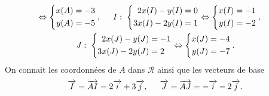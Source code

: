 \begin{enumerate}
\begin{multline*}
  \Leftrightarrow
  \left\lbrace
  \begin{aligned}
    x(A) &= -3\\
    y(A) &= -5
  \end{aligned}
\right. ,\hspace{0.5cm}
I:\;  \left\lbrace
  \begin{aligned}
    2x(I) - y(I) &= 0 \\3x(I) - 2y(I) &= 1 
  \end{aligned}
  \right.
  \Leftrightarrow
  \left\lbrace
  \begin{aligned}
    x(I) &= -1\\
    y(I) &= -2
  \end{aligned}
\right. ,\hspace{0.5cm} \\
J:\;  \left\lbrace
  \begin{aligned}
    2x(J) - y(J) &= -1 \\3x(J) - 2y(J) &= 2 
  \end{aligned}
  \right.
  \Leftrightarrow
  \left\lbrace
  \begin{aligned}
    x(J) &= -4\\
    y(J) &= -7
  \end{aligned}
\right..
\end{multline*}
On connait les coordonnées de $A$ dans $\mathcal{R}$ ainsi que les vecteurs de base
\[
  \overrightarrow{I} = \overrightarrow{AI} = 2\overrightarrow{i} + 3\overrightarrow{j},\hspace{0.5cm}
  \overrightarrow{J} = \overrightarrow{AJ} = -\overrightarrow{i} - 2\overrightarrow{j} .
\]
\end{enumerate}
